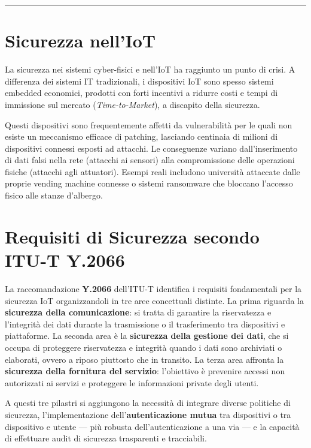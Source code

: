 \documentclass[
  italian,
  openany]{book}
\begin{document}
\begin{center}\rule{0.5\linewidth}{0.5pt}\end{center}

\section{Sicurezza nell'IoT}\label{sicurezza-nelliot}

La sicurezza nei sistemi cyber-fisici e nell'IoT ha raggiunto un punto
di crisi. A differenza dei sistemi IT tradizionali, i dispositivi IoT
sono spesso sistemi embedded economici, prodotti con forti incentivi a
ridurre costi e tempi di immissione sul mercato (\emph{Time-to-Market}),
a discapito della sicurezza.

Questi dispositivi sono frequentemente affetti da vulnerabilità per le
quali non esiste un meccanismo efficace di patching, lasciando centinaia
di milioni di dispositivi connessi esposti ad attacchi. Le conseguenze
variano dall'inserimento di dati falsi nella rete (attacchi ai sensori)
alla compromissione delle operazioni fisiche (attacchi agli attuatori).
Esempi reali includono università attaccate dalle proprie vending
machine connesse o sistemi ransomware che bloccano l'accesso fisico alle
stanze d'albergo.

\section{Requisiti di Sicurezza secondo ITU-T
Y.2066}\label{requisiti-di-sicurezza-secondo-itu-t-y.2066}

La raccomandazione \textbf{Y.2066} dell'ITU-T identifica i requisiti
fondamentali per la sicurezza IoT organizzandoli in tre aree concettuali
distinte. La prima riguarda la \textbf{sicurezza della comunicazione}:
si tratta di garantire la riservatezza e l'integrità dei dati durante la
trasmissione o il trasferimento tra dispositivi e piattaforme. La
seconda area è la \textbf{sicurezza della gestione dei dati}, che si
occupa di proteggere riservatezza e integrità quando i dati sono
archiviati o elaborati, ovvero a riposo piuttosto che in transito. La
terza area affronta la \textbf{sicurezza della fornitura del servizio}:
l'obiettivo è prevenire accessi non autorizzati ai servizi e proteggere
le informazioni private degli utenti.

A questi tre pilastri si aggiungono la necessità di integrare diverse
politiche di sicurezza, l'implementazione dell'\textbf{autenticazione
mutua} tra dispositivi o tra dispositivo e utente --- più robusta
dell'autenticazione a una via --- e la capacità di effettuare audit di
sicurezza trasparenti e tracciabili.
\end{document}
